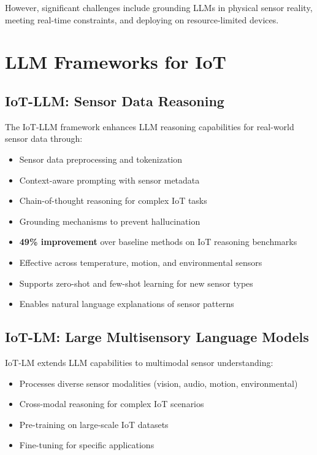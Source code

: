 \documentclass[12pt,a4paper]{article}
\begin{document}
However, significant challenges include grounding LLMs in physical sensor reality, meeting real-time constraints, and deploying on resource-limited devices.

\section{LLM Frameworks for IoT}

\subsection{IoT-LLM: Sensor Data Reasoning}

The IoT-LLM framework enhances LLM reasoning capabilities for real-world sensor data through:
\begin{itemize}
    \item Sensor data preprocessing and tokenization
    \item Context-aware prompting with sensor metadata
    \item Chain-of-thought reasoning for complex IoT tasks
    \item Grounding mechanisms to prevent hallucination
\end{itemize}

\begin{tcolorbox}[colback=llmpurple!10, colframe=llmpurple, title=IoT-LLM Performance]
\begin{itemize}
    \item \textbf{49\% improvement} over baseline methods on IoT reasoning benchmarks
    \item Effective across temperature, motion, and environmental sensors
    \item Supports zero-shot and few-shot learning for new sensor types
    \item Enables natural language explanations of sensor patterns
\end{itemize}
\end{tcolorbox}

\subsection{IoT-LM: Large Multisensory Language Models}

IoT-LM extends LLM capabilities to multimodal sensor understanding:
\begin{itemize}
    \item Processes diverse sensor modalities (vision, audio, motion, environmental)
    \item Cross-modal reasoning for complex IoT scenarios
    \item Pre-training on large-scale IoT datasets
    \item Fine-tuning for specific applications
\end{itemize}
\end{document}
